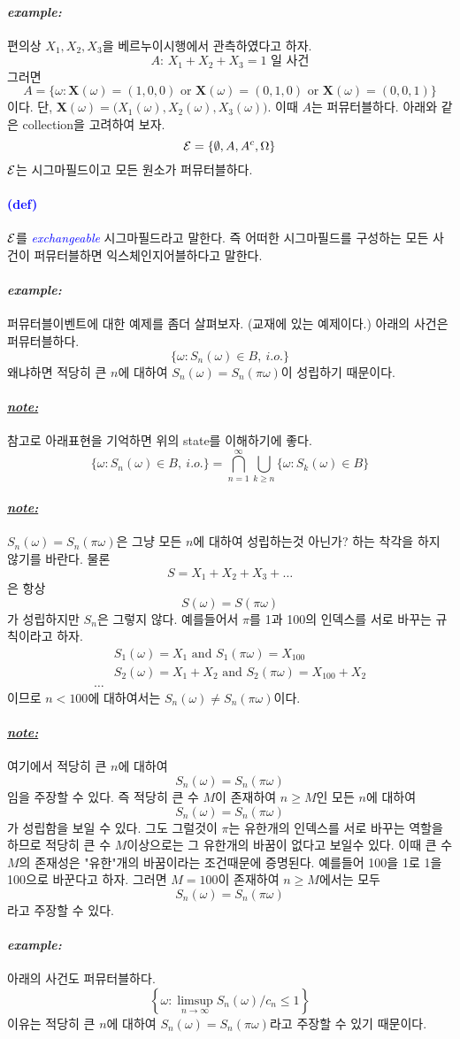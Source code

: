 \documentclass[12pt,oneside,english]{book}
\def\note{\paragraph{\Large\textit{\underline{note:}}}\Large}
\def\ex{\paragraph{\Large\textit{example:}}\Large}
\newcommand{\parablue}[1]{\paragraph{\Large\textcolor{blue}{(#1)}}\Large}
\newcommand{\bsX}{\mbox{$\boldsymbol{X}$}}
\begin{document}
\ex 편의상 $X_1,X_2,X_3$을 베르누이시행에서 관측하였다고 하자. 
\[
\mbox{$A$: $X_1+X_2+X_3=1$ 일 사건} 
\]
그러면 
\[
A=\{\omega: \bsX(\omega)=(1,0,0) \mbox{ or } \bsX(\omega)=(0,1,0) \mbox{ or } \bsX(\omega)=(0,0,1)\}
\]
이다. 단, $\bsX(\omega)=\big(X_1(\omega),X_2(\omega),X_3(\omega)\big)$. 이때 $A$는 퍼뮤터블하다. 아래와 같은 collection을 고려하여 보자. 
\[
{\cal E}=\{\emptyset,A,A^c,\Omega \}
\]
$\cal E$는 시그마필드이고 모든 원소가 퍼뮤터블하다. 

\parablue{def} ${\cal E}$를 \emph{\textcolor{blue}{exchangeable}} 시그마필드라고 말한다. 즉 어떠한 시그마필드를 구성하는 모든 사건이 퍼뮤터블하면 익스체인지어블하다고 말한다. 

\ex 퍼뮤터블이벤트에 대한 예제를 좀더 살펴보자. (교재에 있는 예제이다.) 아래의 사건은 퍼뮤터블하다. 
\[
\{\omega:S_n(\omega) \in B, ~i.o.\}
\]
왜냐하면 적당히 큰 $n$에 대하여 $S_n(\omega)=S_n(\pi\omega)$이 성립하기 때문이다. 

\note 참고로 아래표현을 기억하면 위의 state를 이해하기에 좋다. 
\[
\{\omega:S_n(\omega) \in B, ~i.o.\}=\bigcap_{n=1}^{\infty}\bigcup_{k\geq n}\{\omega: S_k(\omega)\in B\}
\]

\note $S_n(\omega)=S_n(\pi\omega)$은 그냥 모든 $n$에 대하여 성립하는것 아닌가? 하는 착각을 하지 않기를 바란다. 물론 
\[
S=X_1+X_2+X_3+\dots
\]
은 항상 
\[
S(\omega)=S(\pi\omega)
\]가 성립하지만 $S_n$은 그렇지 않다. 예를들어서 $\pi$를 1과 100의 인덱스를 서로 바꾸는 규칙이라고 하자. 
\begin{align*}
& S_1(\omega)=X_1 \mbox{ and } S_1(\pi\omega)=X_{100} \\& S_2(\omega)=X_1+X_2 \mbox{ and } S_2(\pi\omega)=X_{100}+X_2 \\
\dots
\end{align*}
이므로 $n< 100$에 대하여서는 $S_n(\omega)\neq S_n(\pi\omega)$이다. 

\note 여기에서 적당히 큰 $n$에 대하여 
\[
S_n(\omega)=S_n(\pi\omega)
\]
임을 주장할 수 있다. 즉 적당히 큰 수 $M$이 존재하여 $n\geq M$인 모든 $n$에 대하여 
\[
S_n(\omega)=S_n(\pi\omega)
\]
가 성립함을 보일 수 있다. 그도 그럴것이 $\pi$는 유한개의 인덱스를 서로 바꾸는 역할을 하므로 적당히 큰 수 $M$이상으로는 그 유한개의 바꿈이 없다고 보일수 있다. 이때 큰 수 $M$의 존재성은 "유한"개의 바꿈이라는 조건때문에 증명된다. 예를들어 100을 1로 1을 100으로 바꾼다고 하자. 그러면 $M=100$이 존재하여 $n \geq M$에서는 모두 
\[
S_n(\omega)=S_n(\pi\omega)
\]
라고 주장할 수 있다. 

\ex 아래의 사건도 퍼뮤터블하다. 
\[
\left\{\omega:\limsup_{n\to\infty}S_n(\omega)/c_n \leq 1\right\}
\]
이유는 적당히 큰 $n$에 대하여 $S_n(\omega)=S_n(\pi\omega)$라고 주장할 수 있기 때문이다.
\end{document}
